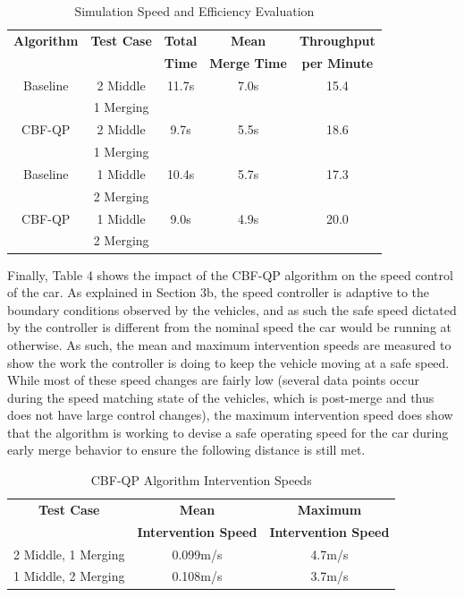 \documentclass[conference]{IEEEtran}
\begin{document}
\begin{table}[htbp]
\caption{Simulation Speed and Efficiency Evaluation}
\centering
\begin{tabular}{|c|c|c|c|c|}
\hline
\textbf{Algorithm} & \textbf{Test Case} & \textbf{Total} & \textbf{Mean} & \textbf{Throughput} \\ 

\textbf{} & \textbf{} & \textbf{Time} & \textbf{Merge Time} & \textbf{per Minute} \\ 
\hline
Baseline & 2 Middle& 11.7s & 7.0s & 15.4 \\ 

 & 1 Merging & & & \\
\hline
CBF-QP & 2 Middle& 9.7s & 5.5s & 18.6 \\ 

 & 1 Merging & & & \\
\hline
Baseline & 1 Middle& 10.4s & 5.7s & 17.3\\ 

 & 2 Merging & & & \\
\hline
CBF-QP & 1 Middle& 9.0s & 4.9s & 20.0 \\ 

 & 2 Merging & & & \\
\hline
\end{tabular}
\end{table}

Finally, Table 4 shows the impact of the CBF-QP algorithm on the speed control of the car. As explained in Section 3b, the speed controller is adaptive to the boundary conditions observed by the vehicles, and as such the safe speed dictated by the controller is different from the nominal speed the car would be running at otherwise. As such, the mean and maximum intervention speeds are measured to show the work the controller is doing to keep the vehicle moving at a safe speed. While most of these speed changes are fairly low (several data points occur during the speed matching state of the vehicles, which is post-merge and thus does not have large control changes), the maximum intervention speed does show that the algorithm is working to devise a safe operating speed for the car during early merge behavior to ensure the following distance is still met.

\begin{table}[htbp]
\caption{CBF-QP Algorithm Intervention Speeds}
\centering
\begin{tabular}{|c|c|c|}
\hline 
\textbf{Test Case} & \textbf{Mean} & \textbf{Maximum} \\ 

\textbf{} & \textbf{Intervention Speed} & \textbf{Intervention Speed}\\
\hline
2 Middle, 1 Merging & 0.099m/s & 4.7m/s \\ 
\hline
1 Middle, 2 Merging & 0.108m/s & 3.7m/s \\ 
\hline
\end{tabular}
\end{table}
\end{document}
